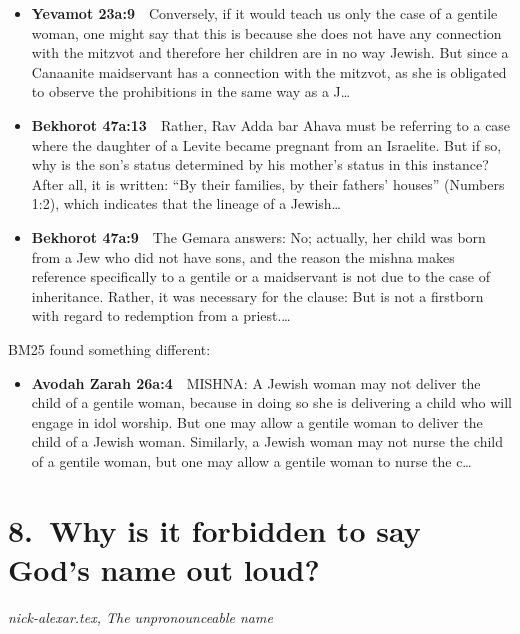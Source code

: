 \documentclass[11pt,a4paper]{article}
\begin{document}
\begin{itemize}[leftmargin=1.2em,itemsep=3pt]
\item {\color{ref}\textbf{Yevamot 23a:9}}\ \ Conversely, if it would teach us only the case of a gentile woman, one might say that this is because she does not have any connection with the mitzvot and therefore her children are in no way Jewish. But since a Canaanite maidservant has a connection with the mitzvot, as she is obligated to observe the prohibitions in the same way as a J\ldots
\item {\color{ref}\textbf{Bekhorot 47a:13}}\ \ Rather, Rav Adda bar Ahava must be referring to a case where the daughter of a Levite became pregnant from an Israelite. But if so, why is the son’s status determined by his mother’s status in this instance? After all, it is written: “By their families, by their fathers’ houses” (Numbers 1:2), which indicates that the lineage of a Jewish\ldots
\item {\color{ref}\textbf{Bekhorot 47a:9}}\ \ The Gemara answers: No; actually, her child was born from a Jew who did not have sons, and the reason the mishna makes reference specifically to a gentile or a maidservant is not due to the case of inheritance. Rather, it was necessary for the clause: But is not a firstborn with regard to redemption from a priest.\ldots
\end{itemize}
{\color{quiet}\small BM25 found something different:}
\begin{itemize}[leftmargin=1.2em]
\item {\color{ref}\textbf{Avodah Zarah 26a:4}}\ \ MISHNA: A Jewish woman may not deliver the child of a gentile woman, because in doing so she is delivering a child who will engage in idol worship. But one may allow a gentile woman to deliver the child of a Jewish woman. Similarly, a Jewish woman may not nurse the child of a gentile woman, but one may allow a gentile woman to nurse the c\ldots
\end{itemize}

\section*{8.\ Why is it forbidden to say God's name out loud?}
{\color{quiet}\small\textit{nick-alexar.tex, The unpronounceable name}}
\end{document}
